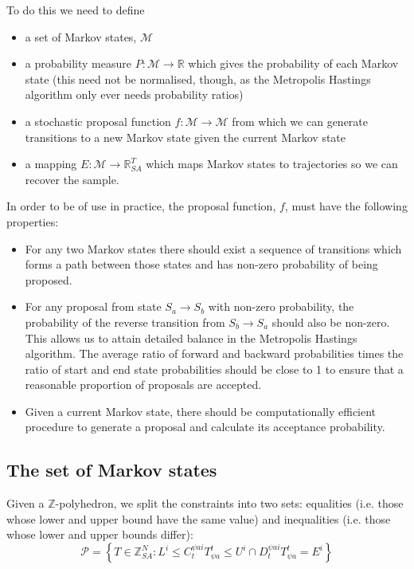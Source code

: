 \documentclass{article}
\begin{document}
To do this we need to define
\begin{itemize}
\item a set of Markov states, $\mathcal{M}$

\item a probability measure $P: \mathcal{M} \to \mathbb{R}$ which gives the probability of each Markov state (this need not be normalised, though, as the Metropolis Hastings algorithm only ever needs probability ratios)

\item a stochastic proposal function $f:\mathcal{M} \to \mathcal{M}$ from which we can generate transitions to a new Markov state given the current Markov state

\item a mapping $E:\mathcal{M} \to \mathbb{R}^T_{SA}$ which maps Markov states to trajectories so we can recover the sample.
\end{itemize}

In order to be of use in practice, the proposal function, $f$, must have the following properties:
\begin{itemize}
	\item For any two Markov states there should exist a sequence of transitions which forms a path between those states and has non-zero probability of being proposed.
	
	\item For any proposal from state $S_a \to S_b$ with non-zero probability, the probability of the reverse transition from $S_b \to S_a$ should also be non-zero. This allows us to attain detailed balance in the Metropolis Hastings algorithm. The average ratio of forward and backward probabilities times the ratio of start and end state probabilities should be close to 1 to ensure that a reasonable proportion of proposals are accepted.
	
	\item Given a current Markov state, there should be computationally efficient procedure to generate a proposal and calculate its acceptance probability. 
\end{itemize}


\subsection{The set of Markov states}

Given a $\mathbb{Z}$-polyhedron, we split the constraints into two sets: equalities (i.e. those whose lower and upper bound have the same value) and inequalities (i.e. those whose lower and upper bounds differ):
\begin{equation}
\mathcal{P} = \left\{T \in \mathbb{Z}^N_{SA}: L^i \le C^{\psi ai}_t T^t_{\psi a} \le U^i \cap D^{\psi ai}_t T^t_{\psi a} = E^i \right\}
\label{zPolySupport}
\end{equation}
\end{document}
